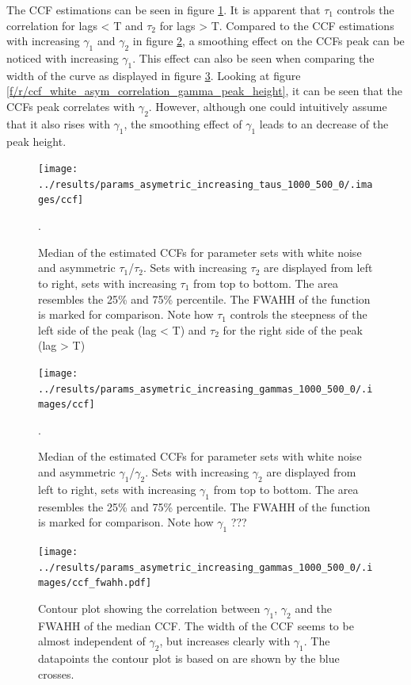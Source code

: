 \documentclass[a4paper,12pt,oneside]{book}
\theoremstyle{break}
\begin{document}
The  \ac{CCF} estimations can be seen in figure \ref{f/r/ccf_white_asym_tau+correlation}. It is apparent that $\tau_1$ controls the correlation for lags < T and $\tau_2$ for lags > T. Compared to the \ac{CCF} estimations with increasing $\gamma_1$ and $\gamma_2$ in figure \ref{f/r/ccf_white_asym_gamma+correlation}, a smoothing effect on the CCFs peak can be noticed with increasing $\gamma_1$.
This effect can also be seen when comparing the width of the curve as displayed in figure \ref{f/r/ccf_white_asym_correlation_gamma_fwahh}.
Looking at figure \ref{f/r/ccf_white_asym_correlation_gamma_peak_height}, it can be seen that the CCFs peak correlates with $\gamma_2$. 
However, although one could intuitively assume that it also rises with $\gamma_1$, the smoothing effect of $\gamma_1$ leads to an decrease of the peak height.





\begin{figure}
	\texttt{[image: ../results/params\_asymetric\_increasing\_taus\_1000\_500\_0/.images/ccf]}%
	\caption{Median of the estimated CCFs for parameter sets with white noise and asymmetric $\tau_1$/$\tau_2$. Sets with increasing $\tau_2$ are displayed from left to right, sets with increasing $\tau_1$ from top to bottom. The area resembles the 25\% and 75\% percentile. The \ac{FWAHH} of the function is marked for comparison. Note how $\tau_1$ controls the steepness of the left side of the peak (lag < T) and $\tau_2$ for the right side of the peak (lag > T)}.%
	\label{f/r/ccf_white_asym_tau+correlation}
\end{figure}

\begin{figure}
	\texttt{[image: ../results/params\_asymetric\_increasing\_gammas\_1000\_500\_0/.images/ccf]}%
	\caption{Median of the estimated CCFs for parameter sets with white noise and asymmetric $\gamma_1$/$\gamma_2$. Sets with increasing $\gamma_2$ are displayed from left to right, sets with increasing $\gamma_1$ from top to bottom. The area resembles the 25\% and 75\% percentile. The \ac{FWAHH} of the function is marked for comparison. Note how $\gamma_1$ ???}.%
	\label{f/r/ccf_white_asym_gamma+correlation}
\end{figure}

\begin{figure}
	\texttt{[image: ../results/params\_asymetric\_increasing\_gammas\_1000\_500\_0/.images/ccf\_fwahh.pdf]}%
	\caption{Contour plot showing the correlation between $\gamma_1$, $\gamma_2$ and the \ac{FWAHH} of the median CCF. The width of the CCF seems to be almost independent of $\gamma_2$, but increases clearly with $\gamma_1$. The datapoints  the contour plot is based on are shown by the blue crosses.}%
	\label{f/r/ccf_white_asym_correlation_gamma_fwahh}
\end{figure}
\end{document}
